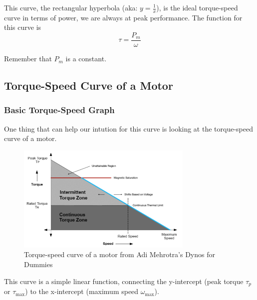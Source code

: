 \documentclass[12pt]{article}
\begin{document}
This curve, the rectangular hyperbola (aka: $y=\frac{1}{x}$), is the ideal torque-speed curve in terms of power, we are always at peak performance. The function for this curve is 
\begin{equation}
  \tau = \frac{P_{m}}{\omega}
\end{equation}

Remember that $P_{m}$ is a constant.

\subsection{Torque-Speed Curve of a Motor}

\subsubsection{Basic Torque-Speed Graph}

One thing that can help our intution for this curve is looking at the torque-speed curve of a motor.

\begin{figure}[H]
  \centering
  \includegraphics[width=0.75\textwidth]{motor-torque-speed.png}
  \caption{Torque-speed curve of a motor from Adi Mehrotra's Dynos for Dummies}\label{fig:dynos_for_dummies}
\end{figure}

This curve is a simple linear function, connecting the y-intercept (peak torque $\tau_{p}$ or $\tau_{\max}$) to the x-intercept (maximum speed $\omega_{\max}$). 
\end{document}
